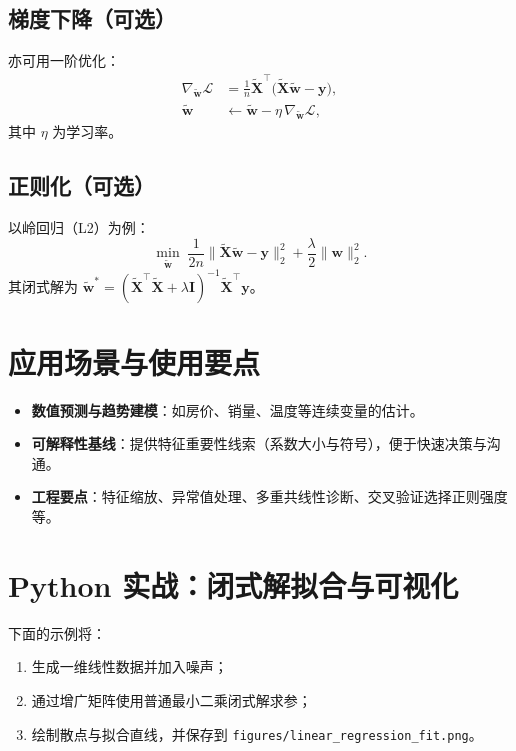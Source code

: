 \documentclass[UTF8,zihao=-4]{ctexart}
\begin{document}
\subsection{梯度下降（可选）}
亦可用一阶优化：
\begin{align}
    \nabla_{\tilde{\mathbf{w}}} \mathcal{L} &= \frac{1}{n} \tilde{\mathbf{X}}^\top\big(\tilde{\mathbf{X}}\tilde{\mathbf{w}} - \mathbf{y}\big),\\
    \tilde{\mathbf{w}} &\leftarrow \tilde{\mathbf{w}} - \eta\, \nabla_{\tilde{\mathbf{w}}} \mathcal{L},
\end{align}
其中 \(\eta\) 为学习率。

\subsection{正则化（可选）}
以岭回归（L2）为例：
\begin{equation}
    \min_{\tilde{\mathbf{w}}}\; \frac{1}{2n}\lVert \tilde{\mathbf{X}}\tilde{\mathbf{w}}-\mathbf{y}\rVert_2^2 + \frac{\lambda}{2}\lVert \mathbf{w}\rVert_2^2.
\end{equation}
其闭式解为 \(\tilde{\mathbf{w}}^* = (\tilde{\mathbf{X}}^\top\tilde{\mathbf{X}} + \lambda\mathbf{I})^{-1}\tilde{\mathbf{X}}^\top\mathbf{y}\)。

\section{应用场景与使用要点}
\begin{itemize}
  \item \textbf{数值预测与趋势建模}：如房价、销量、温度等连续变量的估计。
  \item \textbf{可解释性基线}：提供特征重要性线索（系数大小与符号），便于快速决策与沟通。
  \item \textbf{工程要点}：特征缩放、异常值处理、多重共线性诊断、交叉验证选择正则强度等。
\end{itemize}

\section{Python 实战：闭式解拟合与可视化}
下面的示例将：
\begin{enumerate}
  \item 生成一维线性数据并加入噪声；
  \item 通过增广矩阵使用普通最小二乘闭式解求参；
  \item 绘制散点与拟合直线，并保存到 \texttt{figures/linear\_regression\_fit.png}。
\end{enumerate}
\end{document}
